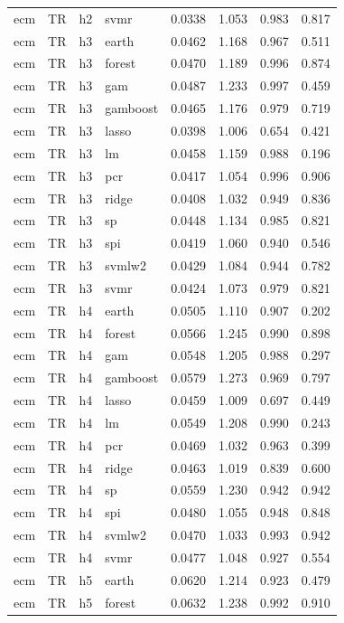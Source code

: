 \begin{ThreePartTable}
\begin{longtable}[t]{llclcccc}
ecm & TR & h2 & svmr & 0.0338 & 1.053 & 0.983 & 0.817\\
\addlinespace
ecm & TR & h3 & earth & 0.0462 & 1.168 & 0.967 & 0.511\\
ecm & TR & h3 & forest & 0.0470 & 1.189 & 0.996 & 0.874\\
ecm & TR & h3 & gam & 0.0487 & 1.233 & 0.997 & 0.459\\
ecm & TR & h3 & gamboost & 0.0465 & 1.176 & 0.979 & 0.719\\
ecm & TR & h3 & lasso & 0.0398 & 1.006 & 0.654 & 0.421\\
ecm & TR & h3 & lm & 0.0458 & 1.159 & 0.988 & 0.196\\
ecm & TR & h3 & pcr & 0.0417 & 1.054 & 0.996 & 0.906\\
ecm & TR & h3 & ridge & 0.0408 & 1.032 & 0.949 & 0.836\\
ecm & TR & h3 & sp & 0.0448 & 1.134 & 0.985 & 0.821\\
ecm & TR & h3 & spi & 0.0419 & 1.060 & 0.940 & 0.546\\
ecm & TR & h3 & svmlw2 & 0.0429 & 1.084 & 0.944 & 0.782\\
ecm & TR & h3 & svmr & 0.0424 & 1.073 & 0.979 & 0.821\\
\addlinespace
ecm & TR & h4 & earth & 0.0505 & 1.110 & 0.907 & 0.202\\
ecm & TR & h4 & forest & 0.0566 & 1.245 & 0.990 & 0.898\\
ecm & TR & h4 & gam & 0.0548 & 1.205 & 0.988 & 0.297\\
ecm & TR & h4 & gamboost & 0.0579 & 1.273 & 0.969 & 0.797\\
ecm & TR & h4 & lasso & 0.0459 & 1.009 & 0.697 & 0.449\\
ecm & TR & h4 & lm & 0.0549 & 1.208 & 0.990 & 0.243\\
ecm & TR & h4 & pcr & 0.0469 & 1.032 & 0.963 & 0.399\\
ecm & TR & h4 & ridge & 0.0463 & 1.019 & 0.839 & 0.600\\
ecm & TR & h4 & sp & 0.0559 & 1.230 & 0.942 & 0.942\\
ecm & TR & h4 & spi & 0.0480 & 1.055 & 0.948 & 0.848\\
ecm & TR & h4 & svmlw2 & 0.0470 & 1.033 & 0.993 & 0.942\\
ecm & TR & h4 & svmr & 0.0477 & 1.048 & 0.927 & 0.554\\
\addlinespace
ecm & TR & h5 & earth & 0.0620 & 1.214 & 0.923 & 0.479\\
ecm & TR & h5 & forest & 0.0632 & 1.238 & 0.992 & 0.910\\

\end{longtable}
\end{ThreePartTable}

